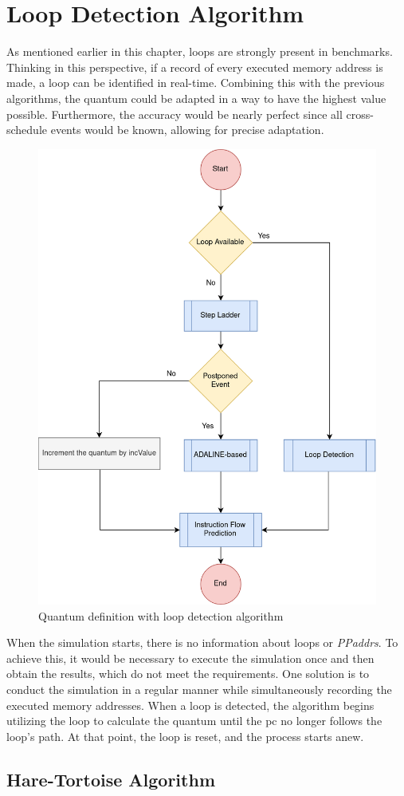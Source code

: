 \section{Loop Detection Algorithm}

As mentioned earlier in this chapter, loops are strongly present in benchmarks. Thinking in this perspective, if a record of every executed 
memory address is made, a loop can be identified in real-time. Combining this with the previous algorithms, the quantum could be adapted in a way 
to have the highest value possible. Furthermore, the accuracy would be nearly perfect since all cross-schedule events would be known, allowing 
for precise adaptation.


\begin{figure}[h!]
	\centering
 	\includegraphics[width=0.55\linewidth]{Images/ADA_and_REP.png}
 	\caption{Quantum definition with loop detection algorithm}
	 \label{fig_ADA_and_REP}
\end{figure}


When the simulation starts, there is no information about loops or \textit{PPaddrs}. To achieve this, it would be necessary to execute the simulation 
once and then obtain the results, which do not meet the requirements. One solution is to conduct the simulation in a regular manner while 
simultaneously recording the executed memory addresses. When a loop is detected, the algorithm begins utilizing the loop to calculate the quantum 
until the \gls{pc} no longer follows the loop's path. At that point, the loop is reset, and the process starts anew.

\subsection{Hare-Tortoise Algorithm}

